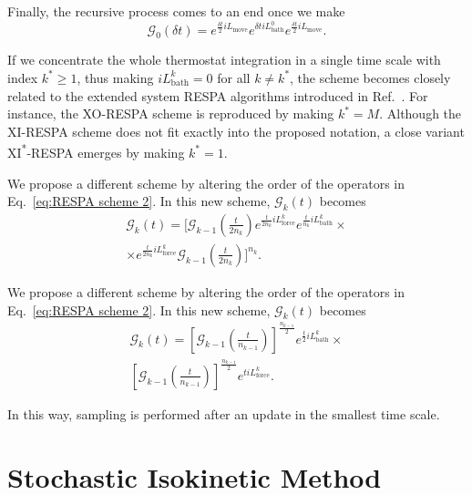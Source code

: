 \documentclass[
    journal=jctcce,
    layout=twocolumn
]{achemso}
\newcommand{\Liu}{i\!L}
\begin{document}
Finally, the recursive process comes to an end once we make
\begin{equation}
\label{eq:RESPA innermost propagator}
\mathcal{G}_0(\delta t) = e^{\frac{\delta t}{2} \Liu_\mathrm{move}}
e^{\delta t \Liu_\mathrm{bath}^0}
e^{\frac{\delta t}{2} \Liu_\mathrm{move}}.
\end{equation}

If we concentrate the whole thermostat integration in a single time scale with index $k^\ast \ge 1$, thus making $\Liu_\mathrm{bath}^k = 0$ for all $k \neq k^\ast$, the scheme becomes closely related to the extended system RESPA algorithms introduced in Ref.~.
For instance, the XO-RESPA scheme \cite{Martyna_1996} is reproduced by making $k^\ast = M$.
Although the XI-RESPA scheme \cite{Martyna_1996} does not fit exactly into the proposed notation, a close variant XI\textsuperscript{*}-RESPA emerges by making $k^\ast = 1$.

We propose a different scheme by altering the order of the operators in Eq.~\eqref{eq:RESPA scheme 2}.
In this new scheme, $\mathcal{G}_k(t)$ becomes
\begin{multline}
\label{eq:RESPA scheme 2}
\mathcal{G}_k(t) = \Big[\mathcal{G}_{k-1}\left(\tfrac{t}{2n_k}\right)
e^{\frac{t}{2 n_k} \Liu_\mathrm{force}^k}
e^{\frac{t}{n_k} \Liu_\mathrm{bath}^k}
\times \\
\times e^{\frac{t}{2 n_k} \Liu_\mathrm{force}^k}
\mathcal{G}_{k-1}\left(\tfrac{t}{2n_k}\right)
\Big]^{n_k}.
\end{multline}

We propose a different scheme by altering the order of the operators in Eq.~\eqref{eq:RESPA scheme 2}.
In this new scheme, $\mathcal{G}_k(t)$ becomes
\begin{multline}
\label{eq:RESPA new scheme}
\mathcal{G}_k(t) = 
\left[\mathcal{G}_{k-1}\left(\tfrac{t}{n_{k-1}}\right)\right]^\frac{n_{k-1}}{2}
e^{\frac{t}{2} \Liu_\mathrm{bath}^k} \times \\
\left[\mathcal{G}_{k-1}\left(\tfrac{t}{n_{k-1}}\right)\right]^\frac{n_{k-1}}{2}
e^{t \Liu_\mathrm{force}^k}.
\end{multline}

In this way, sampling is performed after an update in the smallest time scale.

\section{Stochastic Isokinetic Method}
\end{document}
